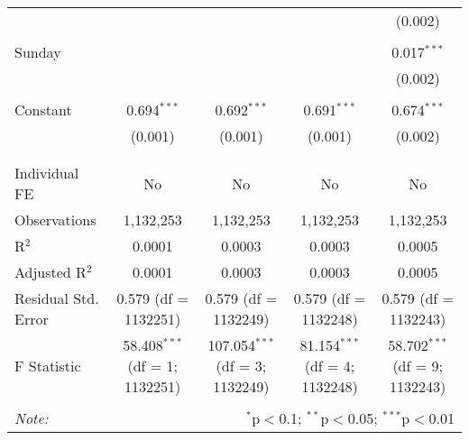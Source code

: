 \documentclass[
]{article}
\begin{document}
\begin{table}[!htbp]
{\begin{tabular}{@{\extracolsep{5pt}}lcccc}
  &  &  &  & (0.002) \\ 
  & & & & \\ 
 Sunday &  &  &  & 0.017$^{***}$ \\ 
  &  &  &  & (0.002) \\ 
  & & & & \\ 
 Constant & 0.694$^{***}$ & 0.692$^{***}$ & 0.691$^{***}$ & 0.674$^{***}$ \\ 
  & (0.001) & (0.001) & (0.001) & (0.002) \\ 
  & & & & \\ 
\hline \\[-1.8ex] 
Individual FE & No & No & No & No \\ 
Observations & 1,132,253 & 1,132,253 & 1,132,253 & 1,132,253 \\ 
R$^{2}$ & 0.0001 & 0.0003 & 0.0003 & 0.0005 \\ 
Adjusted R$^{2}$ & 0.0001 & 0.0003 & 0.0003 & 0.0005 \\ 
Residual Std. Error & 0.579 (df = 1132251) & 0.579 (df = 1132249) & 0.579 (df = 1132248) & 0.579 (df = 1132243) \\ 
F Statistic & 58.408$^{***}$ (df = 1; 1132251) & 107.054$^{***}$ (df = 3; 1132249) & 81.154$^{***}$ (df = 4; 1132248) & 58.702$^{***}$ (df = 9; 1132243) \\ 
\hline 
\hline \\[-1.8ex] 
\textit{Note:}  & \multicolumn{4}{r}{$^{*}$p$<$0.1; $^{**}$p$<$0.05; $^{***}$p$<$0.01} \\ 
\end{tabular}
} 
\end{table} 
\newpage
\end{document}
